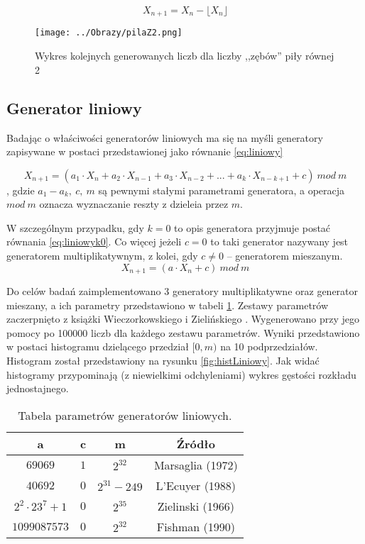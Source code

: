 \documentclass[12pt,a4paper]{article}
\begin{document}
\begin{equation}\label{eq:pilaZ1}
X_{n+1} = X_{n} - \lfloor X_{n}\rfloor
\end{equation}

\begin{figure}[!h]
\centering
\texttt{[image: ../Obrazy/pilaZ2.png]} 
\caption{Wykres kolejnych generowanych liczb dla liczby ,,zębów'' piły równej 2}
\label{fig:pilaZ2}
\end{figure}

\subsection{Generator liniowy}
Badając o właściwości generatorów liniowych ma się na myśli generatory zapisywane w postaci przedstawionej jako równanie \ref{eq:liniowy}

\begin{equation}\label{eq:liniowy}
X_{n+1} = (a_{1} \cdot X_{n} + a_{2} \cdot X_{n-1} + a_{3} \cdot X_{n-2} + ... + a_{k} \cdot X_{n-k+1} + c )\ mod\ m
\end{equation}
, gdzie $a_{1} - a_{k},\ c,\ m$ są pewnymi stałymi parametrami generatora, a operacja $mod\ m$ oznacza wyznaczanie reszty z dzieleia przez $m$.

W szczególnym przypadku, gdy $k=0$ to opis generatora przyjmuje postać równania \ref{eq:liniowyk0}.
Co więcej jeżeli $c = 0$ to taki generator nazywany jest generatorem multiplikatywnym, z kolei, gdy $c \neq 0$ -- generatorem mieszanym.
\begin{equation}\label{eq:liniowyk0}
X_{n+1} = (a \cdot X_{n}+ c )\ mod\ m
\end{equation}

Do celów badań zaimplementowano 3 generatory multiplikatywne oraz generator mieszany, a ich parametry przedstawiono w tabeli \ref{tab:parametry}.
Zestawy parametrów zaczerpnięto z książki Wieczorkowskiego i Zielińskiego \cite{generatory1997Wieczorkowski}.
Wygenerowano przy jego pomocy po 100000 liczb dla każdego zestawu parametrów. 
Wyniki przedstawiono w postaci histogramu dzielącego przedział $[0,m)$ na 10 podprzedziałów.
Histogram został przedstawiony na rysunku \ref{fig:histLiniowy}.
Jak widać histogramy przypominają (z niewielkimi odchyleniami) wykres gęstości rozkładu jednostajnego.


\begin{table}[H]
\begin{center}
\begin{tabular}{|c|c|c|c|}
\hline
\textbf{a} & \textbf{c} & \textbf{m} & \textbf{Źródło} \\
\hline
$69069$ & $1$ & $2^{32}$ & Marsaglia (1972) \\
\hline
$40692$ & $0$ & $2^{31}-249$ & L'Ecuyer (1988) \\
\hline
$2^{2} \cdot 23^{7} + 1$ & $0$ & $2^{35}$ & Zielinski (1966) \\
\hline
$1099087573$ & $0$ & $2^{32}$ & Fishman (1990) \\
\hline
\end{tabular}
\caption{Tabela parametrów generatorów liniowych.}
\label{tab:parametry}
\end{center}
\end{table}
\end{document}
